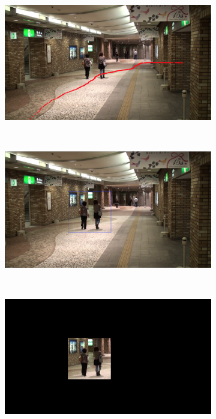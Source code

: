 \documentclass[12pt,a4paper,twoside]{article}
\begin{document}
\begin{figure}
    \centering
    \begin{subfigure}[b]{0.45\textwidth}
        \includegraphics[width=\textwidth]{images/middle_point_traj}
        \caption{}
        \label{fig:middle_point_traj}
    \end{subfigure}
    ~
    \begin{subfigure}[b]{0.45\textwidth}
        \includegraphics[width=\textwidth]{images/bounding_box}
        \caption{}
        \label{fig:bounding_box}
    \end{subfigure}
    ~
    \begin{subfigure}[b]{0.45\textwidth}
        \includegraphics[width=\textwidth]{images/masked}

\end{subfigure}
\end{figure}
\end{document}
